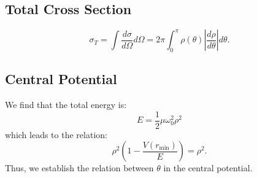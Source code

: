 \subsection*{Total Cross Section}
\[
\sigma_T = \int \frac{d\sigma}{d\Omega} d\Omega = 2\pi \int_0^\pi \rho (\theta) \left| \frac{d\rho}{d\theta} \right| d\theta.
\]

\subsection*{Central Potential}
We find that the total energy is:
\[
E = \frac{1}{2} \mu \omega_0^2 \rho^2
\]
which leads to the relation:
\[
\rho^2 \left(1 - \frac{V (r_{\min})}{E} \right) = \rho^2.
\]
Thus, we establish the relation between $\theta$ in the central potential.

